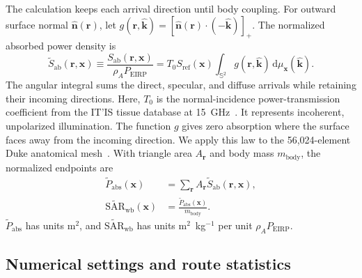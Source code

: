 \documentclass{IEEEoj}
\begin{document}
The calculation keeps each arrival direction until body coupling. For outward
surface normal $\widehat{\mathbf{n}}(\mathbf{r})$, let
$g(\mathbf{r},\widehat{\mathbf{k}})=[\widehat{\mathbf{n}}(\mathbf{r})\cdot
(-\widehat{\mathbf{k}})]_+$. The normalized absorbed power density is
\begin{equation}
\widetilde{S}_{\mathrm{ab}}(\mathbf{r},\mathbf{x})
\equiv\frac{S_{\mathrm{ab}}(\mathbf{r},\mathbf{x})}{\rho_A P_{\mathrm{EIRP}}}
=T_0S_{\mathrm{ref}}(\mathbf{x})
\int_{\mathbb{S}^2}g(\mathbf{r},\widehat{\mathbf{k}})\,
\mathrm{d}\mu_{\mathbf{x}}(\widehat{\mathbf{k}}) .
\label{eq:body-coupling}
\end{equation}
The angular integral sums the direct, specular, and diffuse arrivals while
retaining their incoming directions.
Here, $T_0$ is the normal-incidence power-transmission coefficient from the
IT'IS tissue database at 15~GHz~\cite{itis}. It represents incoherent,
unpolarized illumination. The function $g$ gives zero absorption where the
surface faces away from the incoming direction. We apply this law to the
56,024-element Duke anatomical mesh~\cite{christ2010}. With triangle area
$A_{\mathbf{r}}$ and body mass $m_{\mathrm{body}}$, the normalized endpoints are
\begin{equation}
\begin{aligned}
\widetilde{P}_{\mathrm{abs}}(\mathbf{x})
&=\sum_{\mathbf{r}}A_{\mathbf{r}}\widetilde{S}_{\mathrm{ab}}(\mathbf{r},\mathbf{x}), \\
\widetilde{\mathrm{SAR}}_{\mathrm{wb}}(\mathbf{x})
&=\frac{\widetilde{P}_{\mathrm{abs}}(\mathbf{x})}{m_{\mathrm{body}}} .
\end{aligned}
\label{eq:body-endpoints}
\end{equation}
$\widetilde{P}_{\mathrm{abs}}$ has units m$^2$, and
$\widetilde{\mathrm{SAR}}_{\mathrm{wb}}$ has units m$^2$~kg$^{-1}$ per unit
$\rho_A P_{\mathrm{EIRP}}$.

\subsection{Numerical settings and route statistics}
\label{sec:numerical-settings}
\end{document}
